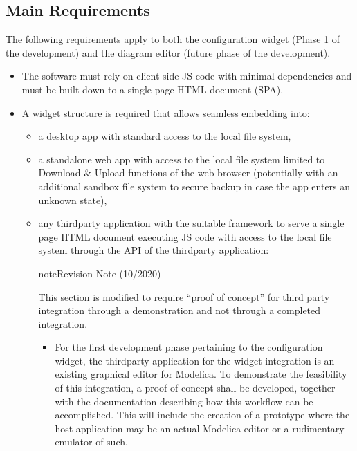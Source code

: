 \documentclass[letterpaper,10pt, openany,english]{sphinxmanual}
\begin{document}
\subsection{Main Requirements}
\label{\detokenize{requirements:main-requirements}}
The following requirements apply to both the configuration widget (Phase 1 of the development) and the diagram editor (future phase of the development).
\begin{itemize}
\item {} 
The software must rely on client side JS code with minimal dependencies and must be built down to a single page HTML document (SPA).

\item {} 
A widget structure is required that allows seamless embedding into:
\begin{itemize}
\item {} 
a desktop app \textendash{} with standard access to the local file system,

\item {} 
a standalone web app \textendash{} with access to the local file system limited to Download \& Upload functions of the web browser (potentially with an additional sandbox file system to secure backup in case the app enters an unknown state),

\item {} 
any third\sphinxhyphen{}party application with the suitable framework to serve a single page HTML document executing JS code \textendash{} with access to the local file system through the API of the third\sphinxhyphen{}party application:

\begin{sphinxadmonition}{note}{Revision Note (10/2020)}

This section is modified to require “proof of concept” for third party integration through a demonstration and not through a completed integration.
\end{sphinxadmonition}
\begin{itemize}
\item {} 
For the first development phase pertaining to the configuration widget, the third\sphinxhyphen{}party application for the widget integration is an existing graphical editor for Modelica.
To demonstrate the feasibility of this integration, a proof of concept shall be developed, together with the documentation describing how this workflow can be accomplished.
This will include the creation of a prototype where the host application may be an actual Modelica editor or a rudimentary emulator of such.


\end{itemize}
\end{itemize}
\end{itemize}
\end{document}
